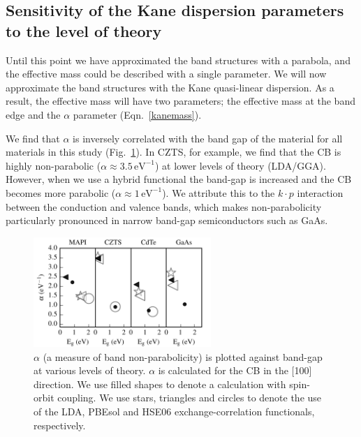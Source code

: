 \subsection{Sensitivity of the Kane dispersion parameters to the level of theory}

Until this point we have approximated the band structures with a parabola, and the effective mass could be described with a single parameter.
We will now approximate the band structures with the Kane quasi-linear dispersion. As a result, the effective mass will have two parameters; the effective mass at the band edge and the $\alpha$ parameter (Eqn.\ \ref{kanemass}).

We find that $\alpha$ is inversely correlated with the band gap of the material for all materials in this study (Fig.\ \ref{alpha_bandgap_plot}). 
In CZTS, for example, we find that the CB is highly non-parabolic ($\alpha\approx3.5\,\textrm{eV}^{-1}$) at lower levels of theory (LDA/GGA).
However, when we use a hybrid functional the band-gap is increased and the CB becomes more parabolic ($\alpha\approx1\,\textrm{eV}^{-1}$).
We attribute this to the $k\cdot p$ interaction between the conduction and valence bands,\autocite{Kane1957} which makes non-parabolicity particularly pronounced in narrow band-gap semiconductors such as GaAs.\autocite{Szmyd1990}

\begin{figure}[tb] \centering
\includegraphics[width=0.6\textwidth]{./figures/ch4/alpha_bandgap_plot.pdf}
\caption[Plot of band non-parabolicity against band-gap at various levels of theory]{\label{alpha_bandgap_plot}$\alpha$ (a measure of band non-parabolicity) is plotted against band-gap at various levels of theory. $\alpha$ is calculated for the CB in the [100] direction. We use filled shapes to denote a calculation with spin-orbit coupling. We use stars, triangles and circles to denote the use of the LDA, PBEsol and HSE06 exchange-correlation functionals, respectively. }
\end{figure}

